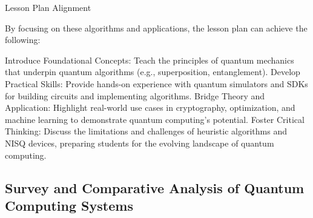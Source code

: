 Lesson Plan Alignment

By focusing on these algorithms and applications, the lesson plan can achieve the following:

Introduce Foundational Concepts: Teach the principles of quantum mechanics that underpin quantum algorithms (e.g., superposition, entanglement).
Develop Practical Skills: Provide hands-on experience with quantum simulators and SDKs for building circuits and implementing algorithms.
Bridge Theory and Application: Highlight real-world use cases in cryptography, optimization, and machine learning to demonstrate quantum computing’s potential.
Foster Critical Thinking: Discuss the limitations and challenges of heuristic algorithms and NISQ devices, preparing students for the evolving landscape of quantum computing.


\subsection{Survey and Comparative Analysis of Quantum Computing Systems}


